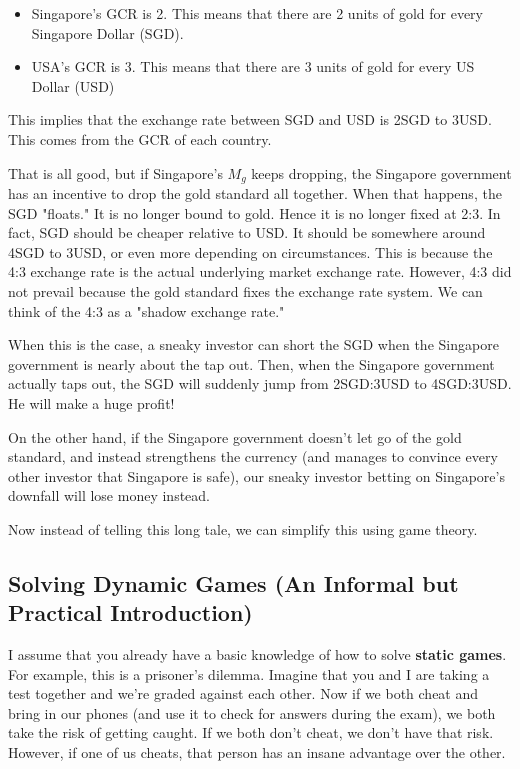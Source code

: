 \documentclass[11pt]{scrartcl}
\begin{document}
\begin{itemize}
\item Singapore's GCR is 2. This means that there are 2 units of gold for every Singapore Dollar (SGD).
\item USA's GCR is 3. This means that there are 3 units of gold for every US Dollar (USD)
\end{itemize}

This implies that the exchange rate between SGD and USD is 2SGD to 3USD. This comes from the GCR of each country.

That is all good, but if Singapore's $M_g$ keeps dropping, the Singapore government has an incentive to drop the gold standard all together. When that happens, the SGD "floats." It is no longer bound to gold. Hence it is no longer fixed at 2:3. In fact, SGD should be cheaper relative to USD. It should be somewhere around 4SGD to 3USD, or even more depending on circumstances. This is because the 4:3 exchange rate is the actual underlying market exchange rate. However, 4:3 did not prevail because the gold standard fixes the exchange rate system. We can think of the 4:3 as a "shadow exchange rate."

When this is the case, a sneaky investor can short the SGD when the Singapore government is nearly about the tap out. Then, when the Singapore government actually taps out, the SGD will suddenly jump from 2SGD:3USD to 4SGD:3USD. He will make a huge profit! 

On the other hand, if the Singapore government doesn't let go of the gold standard, and instead strengthens the currency (and manages to convince every other investor that Singapore is safe), our sneaky investor betting on Singapore's downfall will lose money instead. 

Now instead of telling this long tale, we can simplify this using game theory.

\subsection{Solving Dynamic Games (An Informal but Practical Introduction)}

I assume that you already have a basic knowledge of how to solve \textbf{static games}. For example, this is a prisoner's dilemma. Imagine that you and I are taking a test together and we're graded against each other. Now if we both cheat and bring in our phones (and use it to check for answers during the exam), we both take the risk of getting caught. If we both don't cheat, we don't have that risk. However, if one of us cheats, that person has an insane advantage over the other.
\end{document}
